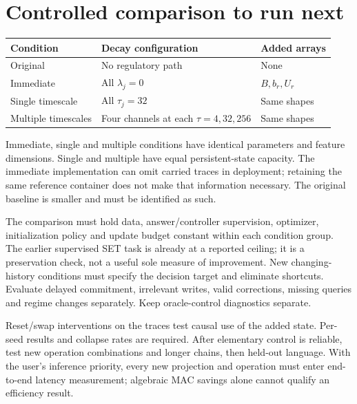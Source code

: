 \documentclass[11pt,a4paper]{article}
\begin{document}
\section{Controlled comparison to run next}
\begin{tabularx}{\linewidth}{@{}l Y l@{}}
\toprule
Condition & Decay configuration & Added arrays\\ \midrule
Original & No regulatory path & None\\
Immediate & All \(\lambda_j=0\) & \(B,b_r,U_r\)\\
Single timescale & All \(\tau_j=32\) & Same shapes\\
Multiple timescales & Four channels at each \(\tau=4,32,256\) & Same shapes\\
\bottomrule
\end{tabularx}
Immediate, single and multiple conditions have identical parameters and feature
dimensions. Single and multiple have equal persistent-state capacity. The
immediate implementation can omit carried traces in deployment; retaining the
same reference container does not make that information necessary. The original
baseline is smaller and must be identified as such.

The comparison must hold data, answer/controller supervision, optimizer,
initialization policy and update budget constant within each condition group.
The earlier supervised SET task is already at a reported ceiling; it is a
preservation check, not a useful sole measure of improvement. New changing-history
conditions must specify the decision target and eliminate shortcuts. Evaluate
delayed commitment, irrelevant writes, valid corrections, missing queries and
regime changes separately. Keep oracle-control diagnostics separate.

Reset/swap interventions on the traces test causal use of the added state.
Per-seed results and collapse rates are required. After elementary control is
reliable, test new operation combinations and longer chains, then held-out
language. With the user's inference priority, every new projection and operation
must enter end-to-end latency measurement; algebraic MAC savings alone cannot
qualify an efficiency result.
\end{document}

